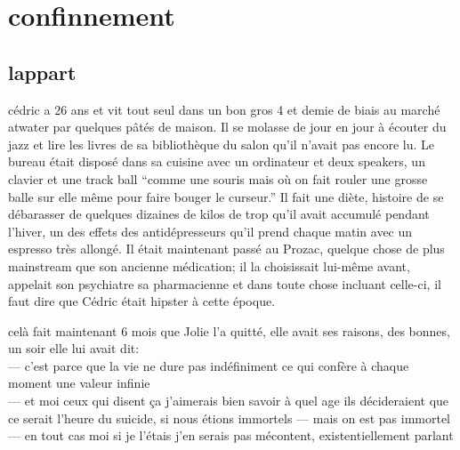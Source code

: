 \documentclass{article}
\begin{document}
\clearpage

\section{confinnement}
\subsection{lappart}
cédric a 26 ans et vit tout seul dans un bon gros 4 et demie de biais au marché
atwater par quelques pâtés de maison. Il se molasse de jour en jour à écouter du
jazz et lire les livres de sa bibliothèque du salon qu'il n'avait pas encore lu.
Le bureau était disposé dans sa cuisine avec un ordinateur et deux speakers, un
clavier et une track ball ``comme une souris mais où on fait rouler une grosse
balle sur elle même pour faire bouger le curseur.'' Il fait une diète, histoire de
se débarasser de quelques dizaines de kilos de trop qu'il avait accumulé pendant
l'hiver, un des effets des antidépresseurs qu'il prend chaque matin avec un
espresso très allongé. Il était maintenant passé au Prozac, quelque chose de
plus mainstream que son ancienne médication; il la choisissait lui-même avant,
appelait son psychiatre sa pharmacienne et dans toute chose incluant celle-ci,
il faut dire que Cédric était hipster à cette époque.

celà fait maintenant 6 mois que Jolie l'a quitté, elle avait ses raisons,
des bonnes, un soir elle lui avait dit:\\
--- c'est parce que la vie ne dure pas indéfiniment ce qui confère à chaque moment une valeur infinie\\
--- et moi ceux qui disent ça j'aimerais bien savoir à quel age ils décideraient que ce serait l'heure du suicide, si nous étions immortels
--- mais on est pas immortel\\
--- en tout cas moi si je l'étais j'en serais pas mécontent, existentiellement parlant

\begin{comment}
\end{comment}
\end{document}
